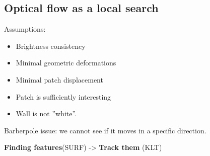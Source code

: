 \subsection*{Optical flow as a local search}
Assumptions:
\begin{itemize}
  \item Brightness consistency
  \item Minimal geometric deformations
  \item Minimal patch displacement
  \item Patch is sufficiently interesting
  \item Wall is not ''white''.
\end{itemize}
Barberpole issue: we cannot see if it moves in a specific direction.

\textbf{Finding features}(SURF) -> \textbf{Track them} (KLT)
